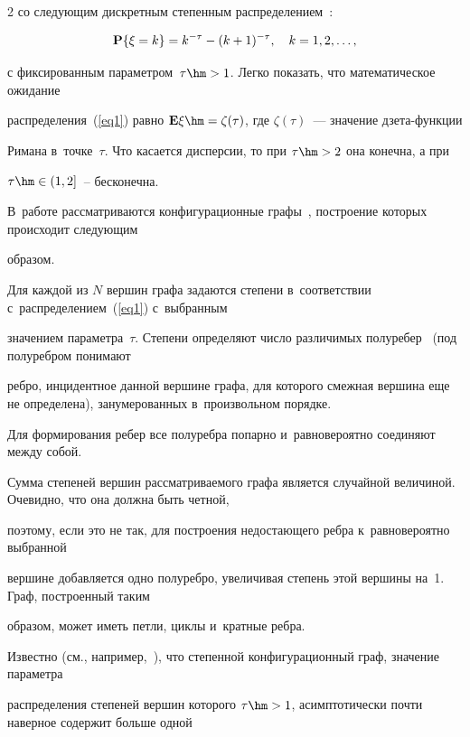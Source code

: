 \begin{multicols}{2}
со сле\-ду\-ющим дискретным степенным распределением~\cite{RN}:

\begin{equation}

\label{eq1}

{\bf P}\{\xi = k\} = k^{-\tau} - (k+1)^{-\tau}, \quad k=1,2,\ldots,

\end{equation}

с фиксированным параметром~$\tau\hm>1$. Легко показать, что математическое ожидание

распределения~(\ref{eq1}) рав\-но ${\bf E}\xi\hm=\zeta(\tau)$, где $\zeta(\tau)$~--- значение дзе\-та-функ\-ции

Римана в~точке~$\tau$. Что касается дисперсии, то при $\tau\hm>2$ она конечна, а при

$\tau\hm\in(1,2]$~-- бесконечна.

В~работе рассматриваются конфигурационные графы~\cite{Bol}, построение которых происходит сле\-ду\-ющим

образом.

Для каждой из $N$ вершин графа задаются степени в~соответствии  с~распределением~(\ref{eq1}) с~выбранным

значением па\-ра\-мет\-ра~$\tau$. Степени определяют чис\-ло различимых полуребер~\cite{RN} (под полуребром понимают

ребро, инцидентное данной вершине графа, для которого смежная вершина еще не определена), занумерованных в~произвольном порядке. 

Для формирования ребер все полуребра попарно и~равновероятно соединяют между собой.

Сумма степеней вершин рас\-смат\-ри\-ва\-емо\-го графа является случайной величиной. Очевидно, что она должна быть чет\-ной,

поэтому, если это не так, для построения недостающего ребра к~равновероятно выбранной

вершине добавляется одно полуребро, увеличивая степень этой вершины на~1. Граф, по\-стро\-ен\-ный таким

образом, может иметь пет\-ли, цик\-лы и~кратные \mbox{ребра}.



Известно (см., например,~\cite{Dur,Hof1,RN}), что степенной конфигурационный граф, значение па\-ра\-мет\-ра

распределения степеней вершин которого $\tau\hm>1$, асимптотически почти наверное содержит больше одной


\end{multicols}
